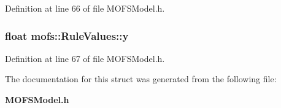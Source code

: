 Definition at line 66 of file M\-O\-F\-S\-Model.\-h.

\subsubsection[{y}]{\setlength{\rightskip}{0pt plus 5cm}float mofs\-::\-Rule\-Values\-::y}\label{structmofs_1_1RuleValues_abff55dde2cdbcb964c3b6cc6aec13f63}


Definition at line 67 of file M\-O\-F\-S\-Model.\-h.



The documentation for this struct was generated from the following file\-:\begin{DoxyCompactItemize}
\item 
{\bf M\-O\-F\-S\-Model.\-h}\end{DoxyCompactItemize}
